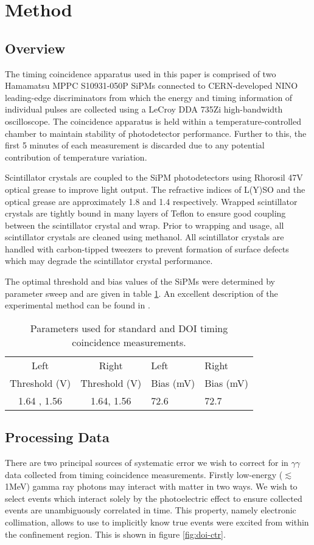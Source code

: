 \section{Method}
\label{sec:method}
\subsection{Overview}
The timing coincidence apparatus used in this paper is comprised of two Hamamatsu MPPC S10931-050P SiPMs connected to CERN-developed NINO leading-edge discriminators from which the energy and timing information of individual pulses are collected using a LeCroy DDA 735Zi high-bandwidth oscilloscope. The coincidence apparatus is held within a temperature-controlled chamber to maintain stability of photodetector performance. Further to this, the first 5 minutes of each measurement is discarded due to any potential contribution of temperature variation.

Scintillator crystals are coupled to the SiPM photodetectors using Rhorosil 47V optical grease to improve light output. The refractive indices of L(Y)SO and the optical grease are approximately 1.8 and 1.4\cite{rhodorsilgrease} respectively. Wrapped scintillator crystals are tightly bound in many layers of Teflon to ensure good coupling between the scintillator crystal and wrap. Prior to wrapping and usage, all scintillator crystals are cleaned using methanol. All scintillator crystals are handled with carbon-tipped tweezers to prevent formation of surface defects which may degrade the scintillator crystal performance. 

The optimal threshold and bias values of the SiPMs were determined by parameter sweep and are given in table \ref{tab:optimumparam}. An excellent description of the experimental method can be found in \cite{ch_Meyer_Pizzichemi_Lecoq_2013}.

\begin{table}
\caption{\label{tab:optimumparam} Parameters used for standard and DOI timing coincidence measurements.} 
\begin{tabular}{ccll}
\hline
Left &  Right & Left & Right\\
Threshold (V) & Threshold (V)& Bias (mV) & Bias (mV)\\
\hline
1.64 , 1.56 &  1.64, 1.56 &  72.6 &  72.7\\
\hline
\end{tabular}
\end{table}

\subsection{Processing Data}
There are two principal sources of systematic error we wish to correct for in $\gamma\gamma$ data collected from timing coincidence measurements. Firstly low-energy ($\lesssim$1MeV) gamma ray photons may interact with matter in two ways. We wish to select events which interact solely by the photoelectric effect to ensure collected events are unambiguously correlated in time. This property, namely electronic collimation, allows to use to implicitly know true events were excited from within the confinement region. This is shown in figure \ref{fig:doi-ctr}.

